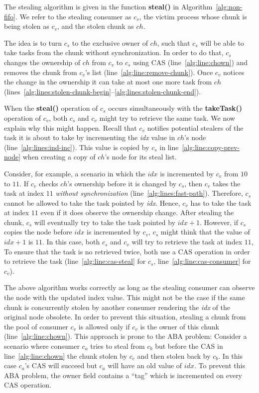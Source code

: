 The stealing algorithm is given in the function {\bf steal()} in Algorithm~\ref{alg:non-fifo}. 
We refer to the stealing consumer as $c_s$, the victim process whose chunk is being stolen as $c_v$, and the stolen chunk as $ch$.

The idea is to turn $c_s$ to the exclusive owner of $ch$, such that $c_s$ will be able to take tasks from the chunk without synchronization. 
In order to do that, $c_s$ changes the ownership of $ch$ from $c_v$ to $c_s$ using CAS (line~\ref{alg:line:chown}) and removes the chunk from $c_v$'s list (line~\ref{alg:line:remove-chunk}). 
Once $c_v$ notices the change in the ownership it can take at most one more task from $ch$ (lines~\ref{alg:lines:stolen-chunk-begin}--\ref{alg:lines:stolen-chunk-end}). 

When the {\bf steal()} operation of $c_s$ occurs simultaneously with the {\bf takeTask()} operation of $c_v$, both $c_s$ and $c_v$ might try to retrieve the same task. We now explain why this might happen. Recall that $c_v$ notifies potential stealers of the task it is about to take by incrementing the \emph{idx} value in $ch$'s node (line~\ref{alg:lines:ind-inc}). This value is copied by $c_s$ in line~\ref{alg:line:copy-prev-node} when creating a copy of $ch$'s node for its steal list.

Consider, for example, a scenario in which the $idx$ is incremented by $c_v$ from $10$ to $11$. 
If $c_v$ checks $ch$'s ownership before it is changed by $c_s$, then $c_v$ takes the task at index $11$ \emph{without synchronization} (line~\ref{alg:lines:fast-path}). Therefore, $c_s$ cannot be allowed to take the task pointed by \emph{idx}. Hence, $c_v$ has to take the task at index $11$ even if it does observe the ownership change. 
After stealing the chunk, $c_s$ will eventually try to take the task pointed by $idx+1$. However, if $c_s$ copies the node before $idx$ is incremented by $c_v$, $c_s$ might think that the value of $idx+1$ is $11$. In this case, both $c_s$ and $c_v$ will try to retrieve the task at index $11$, To ensure that the task is no retrieved twice, both use a CAS operation in order to retrieve the task (line~\ref{alg:line:cas-steal} for $c_s$, line~\ref{alg:line:cas-consumer} for $c_v$). 

The above algorithm works correctly as long as the stealing consumer can observe the node with the updated index value. 
This might not be the case if the same chunk is concurrently stolen by another consumer rendering the \emph{idx} of the original node obsolete. 
In order to prevent this situation, stealing a chunk from the pool of consumer $c_v$ is allowed only if $c_v$ is the owner of this chunk (line~\ref{alg:line:chown}). This approach is prone to the ABA problem: Consider a scenario where consumer $c_a$ tries to steal from $c_b$ but before the CAS in line~\ref{alg:line:chown} the chunk stolen by $c_c$ and then stolen back by $c_b$. In this case $c_a$'s CAS will succeed but $c_a$ will have an old value of $idx$. To prevent this ABA problem, the owner field contains a ``tag'' which is incremented on every CAS operation.

